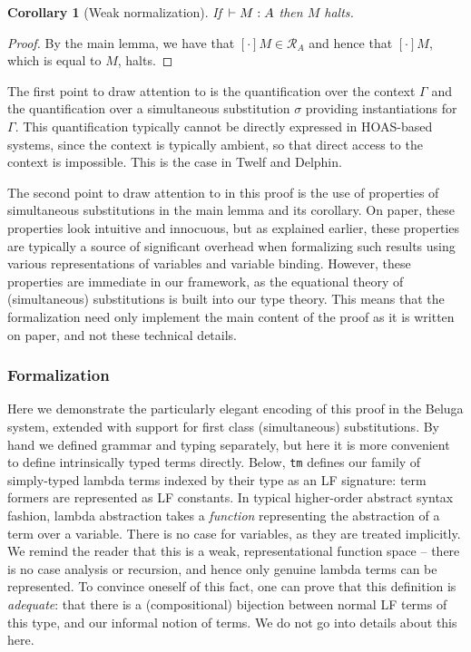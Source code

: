 \documentclass{article}
\newtheorem{corollary}{Corollary}
\begin{document}
\begin{corollary}[Weak normalization]
If $\,\vdash M : A$ then $M$ halts.
\end{corollary}
\begin{proof}
By the main lemma, we have that $[\cdot]M\in \mathcal{R}_A$
and hence that $[\cdot]M$, which is equal to $M$, halts.
\end{proof}

The first point to draw attention to is the quantification
over the context $\Gamma$ and the quantification over a simultaneous
substitution $\sigma$ providing instantiations for $\Gamma$. This
quantification typically cannot be directly expressed in HOAS-based
systems, since the context is typically ambient, so that direct
access to the context is impossible. This is the case in Twelf and
Delphin.

The second point to draw attention to in this proof is the use of
properties of simultaneous substitutions in the main
lemma and its corollary. On paper, these properties look intuitive and
innocuous, but as explained earlier, these properties are typically a source of
significant overhead when formalizing such results using various 
representations of variables and variable binding. However, these
properties are immediate in our framework, as
the equational theory of (simultaneous) substitutions is built into
our type theory. This means that the formalization need only implement
the main content of the proof as it is written on paper, and not these
technical details.

\subsubsection{Formalization}\label{sec:belugaweaknorm}

Here we demonstrate the particularly elegant encoding of this proof in
the Beluga system, extended with support for first
class (simultaneous) substitutions. By hand we defined grammar and
typing separately, but here it is more convenient to define
intrinsically typed terms directly. Below, \lstinline{tm} defines our family of simply-typed lambda
terms indexed by their type as an LF signature: term formers are
represented as LF constants. In typical higher-order abstract syntax fashion, lambda
abstraction takes a \emph{function} representing the abstraction of a
term over a variable. There is no case for variables, as they are
treated implicitly. We remind the reader that this is a weak, representational function space
-- there is no case analysis or recursion, and hence only genuine
lambda terms can be represented. To convince oneself of this fact, one can prove that this definition is
\emph{adequate}: that there is a (compositional) bijection between normal LF terms of
this type, and our informal notion of terms. We do not go into details
about this here.
\end{document}
